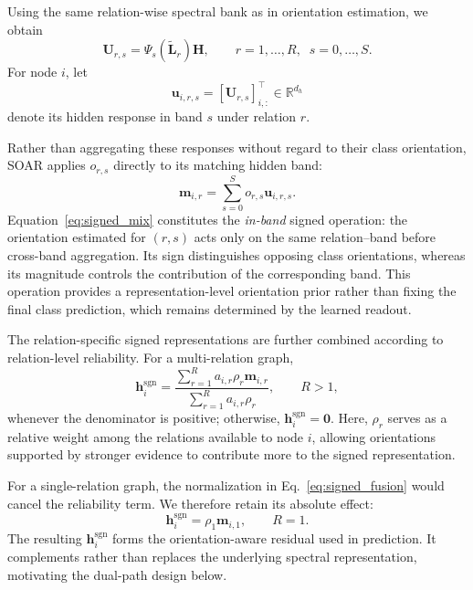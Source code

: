 \documentclass[10pt,journal]{IEEEtran}
\begin{document}
Using the same relation-wise spectral bank as in orientation estimation,
we obtain
\begin{equation}
\mathbf{U}_{r,s}
=
\Psi_s(\widetilde{\mathbf{L}}_r)\mathbf{H},
\qquad
r=1,\ldots,R,\;\;
s=0,\ldots,S.
\label{eq:hidden_band}
\end{equation}
For node $i$, let
\begin{equation}
\mathbf{u}_{i,r,s}
=
[\mathbf{U}_{r,s}]_{i,:}^{\top}
\in\mathbb{R}^{d_h}
\label{eq:hidden_band_node}
\end{equation}
denote its hidden response in band $s$ under relation $r$.

Rather than aggregating these responses without regard to their class
orientation, SOAR applies $o_{r,s}$ directly to its matching hidden band:
\begin{equation}
\mathbf{m}_{i,r}
=
\sum_{s=0}^{S}
o_{r,s}\mathbf{u}_{i,r,s}.
\label{eq:signed_mix}
\end{equation}
Equation~\eqref{eq:signed_mix} constitutes the \emph{in-band} signed
operation: the orientation estimated for $(r,s)$ acts only on the same
relation--band before cross-band aggregation. Its sign distinguishes opposing
class orientations, whereas its magnitude controls the contribution of the
corresponding band. This operation provides a representation-level orientation
prior rather than fixing the final class prediction, which remains determined
by the learned readout.

The relation-specific signed representations are further combined according
to relation-level reliability. For a multi-relation graph,
\begin{equation}
\mathbf{h}^{\mathrm{sgn}}_i
=
\frac{
\sum_{r=1}^{R}
a_{i,r}\rho_r\mathbf{m}_{i,r}
}{
\sum_{r=1}^{R}
a_{i,r}\rho_r
},
\qquad
R>1,
\label{eq:signed_fusion}
\end{equation}
whenever the denominator is positive; otherwise,
$\mathbf{h}^{\mathrm{sgn}}_i=\mathbf{0}$.
Here, $\rho_r$ serves as a relative weight among the relations available to
node $i$, allowing orientations supported by stronger evidence to contribute
more to the signed representation.

For a single-relation graph, the normalization in
Eq.~\eqref{eq:signed_fusion} would cancel the reliability term. We therefore
retain its absolute effect:
\begin{equation}
\mathbf{h}^{\mathrm{sgn}}_i
=
\rho_1\mathbf{m}_{i,1},
\qquad
R=1.
\label{eq:signed_single}
\end{equation}
The resulting $\mathbf{h}^{\mathrm{sgn}}_i$ forms the orientation-aware
residual used in prediction. It complements rather than replaces the
underlying spectral representation, motivating the dual-path design below.
\end{document}
